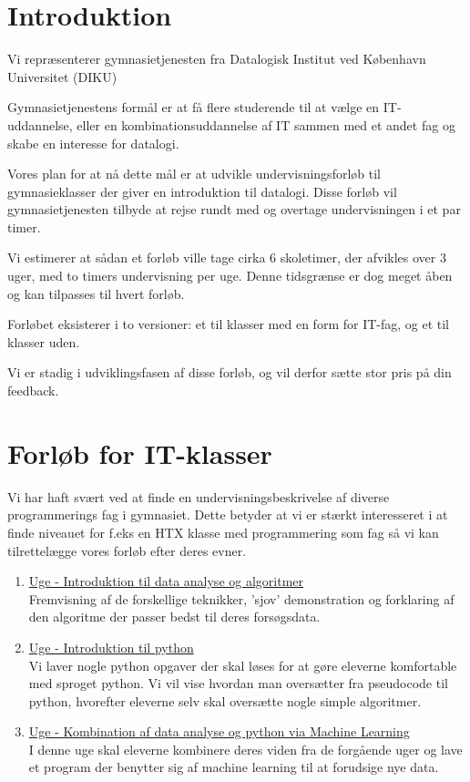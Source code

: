 \documentclass[11pt]{article}
\begin{document}
    \newpage                %
    \setcounter{page}{1}    %
\section{Introduktion}
    Vi repræsenterer gymnasietjenesten fra
    Datalogisk Institut ved København Universitet (DIKU)

    Gymnasietjenestens formål er at få flere studerende til at vælge en
    IT-uddannelse, eller en kombinationsuddannelse af IT sammen med et andet fag
    og skabe en interesse for datalogi.

    Vores plan for at nå dette mål er at udvikle undervisningsforløb til
    gymnasieklasser der giver en introduktion til datalogi. Disse forløb vil
    gymnasietjenesten tilbyde at rejse rundt med og overtage undervisningen i et
    par timer.

    Vi estimerer at sådan et forløb ville tage cirka 6 skoletimer, der afvikles
    over 3 uger, med to timers undervisning per uge. Denne tidsgrænse er dog
    meget åben og kan tilpasses til hvert forløb.

    Forløbet eksisterer i to versioner: et til klasser med en form for IT-fag,
    og et til klasser uden.

    Vi er stadig i udviklingsfasen af disse forløb, og vil derfor sætte stor
    pris på din feedback.

\section{Forløb for IT-klasser}
    Vi har haft svært ved at finde en undervisningsbeskrivelse af diverse
    programmerings fag i gymnasiet. Dette betyder at vi er stærkt interesseret i
    at finde niveauet for f.eks en HTX klasse med programmering som fag så vi
    kan tilrettelægge vores forløb efter deres evner.
    \begin{enumerate}
        \item \underline{Uge - Introduktion til data analyse og algoritmer} ~ \\
        Fremvisning af de forskellige teknikker, 'sjov' demonstration og
        forklaring af den algoritme der passer bedst til deres forsøgsdata.

        \item \underline{Uge - Introduktion til python} ~ \\
        Vi laver nogle python opgaver der skal løses for at gøre eleverne
        komfortable med sproget python. Vi vil vise hvordan man oversætter
        fra pseudocode til python, hvorefter eleverne selv skal oversætte
        nogle simple algoritmer. 

        \item \underline{Uge - Kombination af data analyse og python via
        Machine Learning} ~ \\
        I denne uge skal eleverne kombinere deres viden fra de forgående uger
        og lave et program der benytter sig af machine learning til at forudsige
        nye data.
    \end{enumerate}
    \vspace{-1em}
\end{document}

